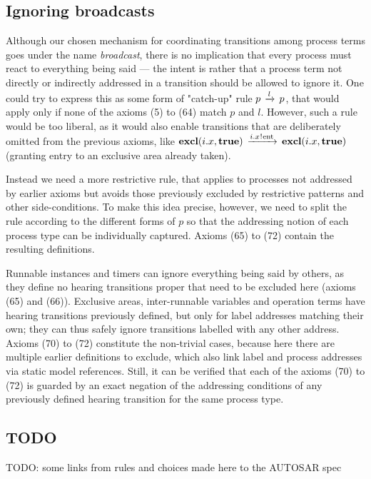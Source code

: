 \documentclass[twocolumn]{article}
\begin{document}
\subsection{Ignoring broadcasts} \label{sect:Ignore}

Although our chosen mechanism for coordinating transitions among process terms goes under the name {\em broadcast}, there is no implication that every process must react to everything being said --- the intent is rather that a process term not directly or indirectly addressed in a transition should be allowed to ignore it. One could try to express this as some form of "catch-up" rule $p \,\xrightarrow{l}\, p$, that would apply only if none of the axioms (5) to (64) match $p$ and $l$. However, such a rule would be too liberal, as it would also enable transitions that are deliberately omitted from the previous axioms, like ${\textbf{excl}(i.x,\textbf{true})} \,\xrightarrow{i.x \mspace{1mu}!\mspace{1mu} \mathrm{ent}}\, {\textbf{excl}(i.x,\textbf{true})}$ (granting entry to an exclusive area already taken). 

Instead we need a more restrictive rule, that applies to processes not addressed by earlier axioms but avoids those previously excluded by restrictive patterns and other side-conditions. To make this idea precise, however, we need to split the rule according to the different forms of $p$ so that the addressing notion of each process type can be individually captured. Axioms (65) to (72) contain the resulting definitions.

Runnable instances and timers can ignore everything being said by others, as they define no hearing transitions proper that need to be excluded here (axioms (65) and (66)). Exclusive areas, inter-runnable variables and operation terms have hearing transitions previously defined, but only for label addresses matching their own; they can thus safely ignore transitions labelled with any other address. 
Axioms (70) to (72) constitute the non-trivial cases, because here there are multiple earlier definitions to exclude, which also link label and process addresses via static model references. Still, it can be verified that each of the axioms (70) to (72) is guarded by an exact negation of the addressing conditions of any previously defined hearing transition for the same process type. 



\subsection{TODO}

TODO: some links from rules and choices made here to the AUTOSAR spec
\end{document}
